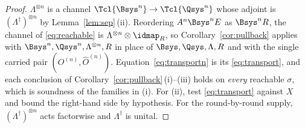 \begin{proof}
$\Lambda^{\otimes n}$ is a channel $\Tcl{\Bsys^{n}}\to\Tcl{\Qsys^{n}}$ whose
adjoint is $(\Lambda^{\dagger})^{\otimes n}$ by Lemma~\ref{lem:sep}\,(ii).
Reordering $A^{n}\Bsys^{n}E$ as $\Bsys^{n}R$, the channel of
\eqref{eq:reachable} is $\Lambda^{\otimes n}\otimes\idmap_R$, so
Corollary~\ref{cor:pullback} applies with
$\Bsys^{n},\Qsys^{n},\Lambda^{\otimes n},R$ in place of
$\Bsys,\Qsys,\Lambda,R$ and with the single carried pair
$(O^{(n)},\hat O^{(n)})$. Equation~\eqref{eq:transportn} is its
\eqref{eq:transport}, and each conclusion of
Corollary~\ref{cor:pullback}\,(i)--(iii) holds on \emph{every} reachable
$\sigma$, which is soundness of the families in (i). For (ii), test
\eqref{eq:transport} against $X$ and bound the right-hand side by hypothesis.
For the round-by-round supply, $(\Lambda^{\dagger})^{\otimes n}$ acts
factorwise and $\Lambda^{\dagger}$ is unital.
\end{proof}
